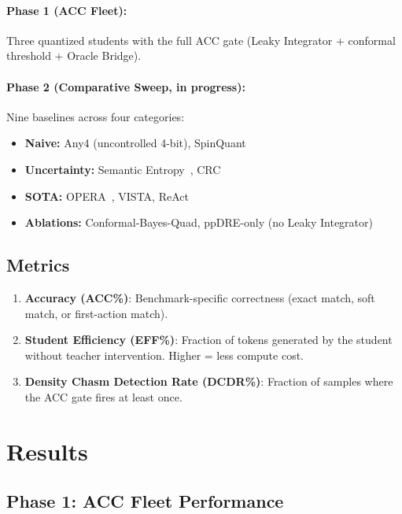 \documentclass[runningheads]{llncs}
\begin{document}
\paragraph{Phase 1 (ACC Fleet):} Three quantized students with the full
ACC gate (Leaky Integrator + conformal threshold + Oracle Bridge).

\paragraph{Phase 2 (Comparative Sweep, in progress):} Nine baselines
across four categories:
\begin{itemize}[itemsep=0pt]
  \item \textbf{Naive:} Any4 (uncontrolled 4-bit), SpinQuant
  \item \textbf{Uncertainty:} Semantic Entropy~\cite{kuhn2023semantic},
    CRC~\cite{angelopoulos2024crc}
  \item \textbf{SOTA:} OPERA~\cite{opera2024}, VISTA, ReAct~\cite{yao2023react}
  \item \textbf{Ablations:} Conformal-Bayes-Quad, ppDRE-only (no
    Leaky Integrator)
\end{itemize}

\subsection{Metrics}

\begin{enumerate}[itemsep=0pt]
  \item \textbf{Accuracy (ACC\%)}: Benchmark-specific correctness
    (exact match, soft match, or first-action match).
  \item \textbf{Student Efficiency (EFF\%)}: Fraction of tokens generated
    by the student without teacher intervention. Higher = less compute cost.
  \item \textbf{Density Chasm Detection Rate (DCDR\%)}: Fraction of samples
    where the ACC gate fires at least once.
\end{enumerate}

\section{Results}
\label{sec:results}

\subsection{Phase 1: ACC Fleet Performance}
\end{document}
